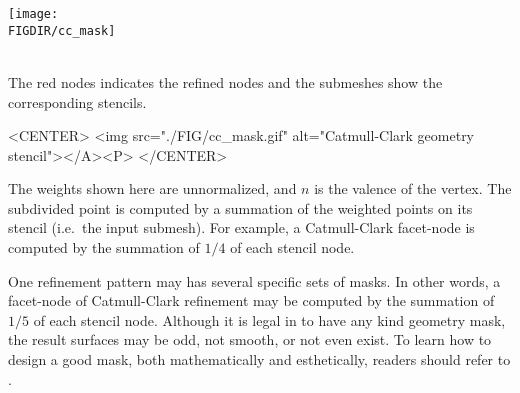 \begin{ccTexOnly}
  \begin{center}
    \parbox{0.4\textwidth}{%
      \texttt{[image: \\FIGDIR/cc\_mask]}%
    } \\ \vspace{0.5cm}
    The red nodes indicates the refined nodes and the submeshes 
    show the corresponding stencils.
  \end{center}
\end{ccTexOnly}

\begin{ccHtmlOnly}
  <CENTER>
     <img src="./FIG/cc_mask.gif" alt="Catmull-Clark geometry stencil"></A><P>
  </CENTER>
\end{ccHtmlOnly}

The weights shown here are unnormalized, and $n$ is the valence 
of the vertex. The subdivided point is computed by a summation
of the weighted points on its stencil (i.e.~the input submesh).
For example, a Catmull-Clark facet-node is computed by the summation
of $1/4$ of each stencil node.

One refinement pattern may has several specific sets of masks. In other 
words, a facet-node of Catmull-Clark refinement may be computed by 
the summation of $1/5$ of each stencil node. Although it is legal in 
 to have any kind geometry mask,
the result surfaces may be odd, not smooth, or not even exist.
To learn how to design a good mask, both mathematically and esthetically, 
readers should refer to \cite{cgal:ww-smgd-02}.




